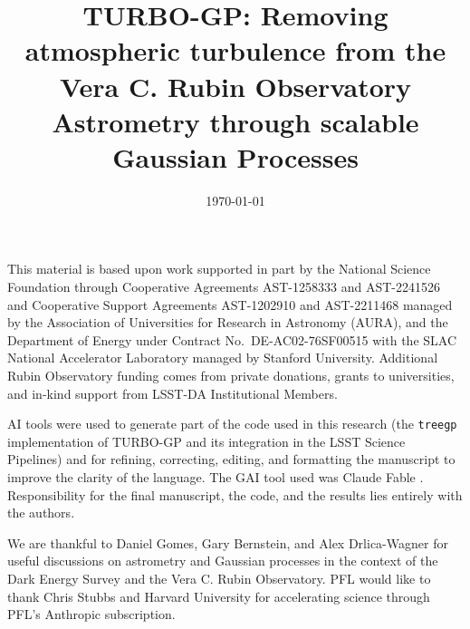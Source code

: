 \documentclass[modern, linenumbers, amsmath]{aastex701}
\newcommand{\NEW}[1]{#1}
\begin{document}

\date{\today}
\title{TURBO-GP: Removing atmospheric turbulence from the Vera C. Rubin Observatory Astrometry through scalable Gaussian Processes}








\begin{acknowledgments}
This material is based upon work supported in part by the National Science Foundation through Cooperative Agreements AST-1258333 and AST-2241526 and 
Cooperative Support Agreements AST-1202910 and AST-2211468 managed by the Association of Universities for Research in Astronomy (AURA), and the 
Department of Energy under Contract No.\ DE-AC02-76SF00515 with the SLAC National Accelerator Laboratory managed by Stanford University.
Additional Rubin Observatory funding comes from private donations, grants to universities, and in-kind support from LSST-DA Institutional Members.

AI tools were used to generate part of the code used in this research (the \texttt{treegp} implementation of TURBO-GP and its integration in the 
LSST Science Pipelines) and for refining, correcting, editing, and formatting the manuscript to improve the clarity of the language. The GAI tool 
used was Claude Fable \citep[versions 5.0 and 5.1;][]{anthropic2026fable}. Responsibility for the final manuscript, the code, and the results lies 
entirely with the authors.

\NEW{We are thankful to Daniel Gomes, Gary Bernstein, and Alex Drlica-Wagner for useful discussions on astrometry and Gaussian processes in the context 
of the Dark Energy Survey and the Vera C. Rubin Observatory.
PFL would like to thank Chris Stubbs and Harvard University for accelerating science through PFL's Anthropic subscription.}

\end{acknowledgments}
\end{document}
